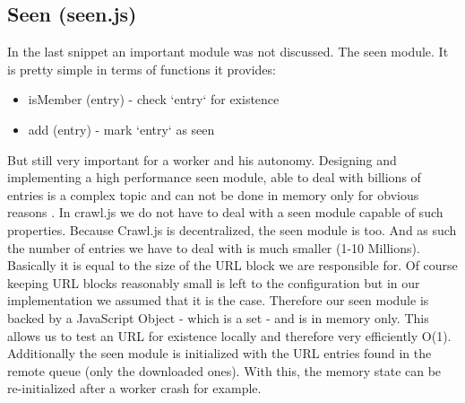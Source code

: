 \subsection{Seen (seen.js)}
In the last snippet an important module was not discussed. The seen module. It is pretty simple in terms of functions it provides:
\begin{itemize}
  \item isMember (entry) - check `entry` for existence
  \item add (entry) - mark `entry` as seen
\end{itemize}
But still very important for a worker and his autonomy. Designing and implementing a high performance seen module, able to deal with billions of entries is a complex topic and can not be done in memory only for obvious reasons \cite{hp_crawler}. In crawl.js we do not have to deal with a seen module capable of such properties. Because Crawl.js is decentralized, the seen module is too. And as such the number of entries we have to deal with is much smaller (1-10 Millions). Basically it is equal to the size of the URL block we are responsible for. Of course keeping URL blocks reasonably small is left to the configuration but in our implementation we assumed that it is the case.
\newline
\newline
Therefore our seen module is backed by a JavaScript Object - which is a set - and is in memory only. This allows us to test an URL for existence locally and therefore very efficiently O(1). Additionally the seen module is initialized with the URL entries found in the remote queue (only the downloaded ones). With this, the memory state can be re-initialized after a worker crash for example. 


